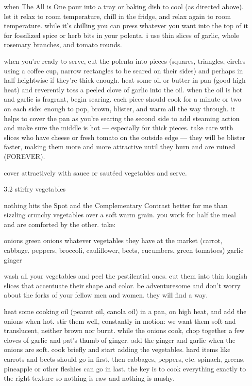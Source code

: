 when The All is One pour into a tray or baking dish to cool (as directed above). let it relax to room temperature, chill in the fridge, and relax again to room temperature. while it's chilling you can press whatever you want into the top of it for fossilized spice or herb bits in your polenta. i use thin slices of garlic, whole rosemary branches, and tomato rounds.

when you're ready to serve, cut the polenta into pieces (squares, triangles, circles using a coffee cup, narrow rectangles to be seared on their sides) and perhaps in half heightwise if they're thick enough. heat some oil or butter in pan (good high heat) and reverently toss a peeled clove of garlic into the oil. when the oil is hot and garlic is fragrant, begin searing. each piece should cook for a minute or two on each side: enough to pop, brown, blister, and warm all the way through. it helps to cover the pan as you're searing the second side to add steaming action and make sure the middle is hot --- especially for thick pieces. take care with slices who have cheese or fresh tomato on the outside edge --- they will be blister faster, making them more and more attractive until they burn and are ruined (FOREVER).

cover attractively with sauce or saut\'{e}ed vegetables and serve.

3.2  stirfry vegetables

nothing hits the Spot and the Complementary Contrast better for me than sizzling crunchy vegetables over a soft warm grain. you work for half the meal and are comforted by the other. take:

onions
green onions
whatever vegetables they have at the market (carrot, cabbage, peppers, broccoli, cauliflower, beets, cucumbers, green tomatoes)
garlic
ginger

wash all your vegetables and peel the pestilential ones. cut them into thin longish slices that accentuate their shape and color. be adventuresome and don't worry about the forks of your fellow men and women. they will find a way.

heat some cooking oil (peanut oil, canola oil) in a pan, on high heat, and add the onions when hot. stir them well, constantly in motion: we want them soft and translucent, neither brown nor burnt.
	while the onions cook, chop together a few cloves of garlic and pat's thumb of ginger. add the ginger and garlic when the onions are soft.
cook briefly and start adding the vegetables. hard items like carrots and beets should go in first, then cabbages, peppers, etc. spinach, greens, pineapple or other fleshies can go in last. the key is to cook everything exactly to the right texture so nothing is raw and nothing is mushy.

